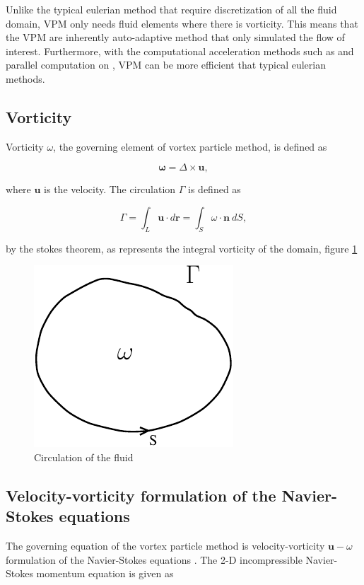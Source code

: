 
Unlike the typical eulerian method that require discretization of all the fluid domain, VPM only needs fluid elements where there is vorticity. This means that the VPM are inherently auto-adaptive method that only simulated the flow of interest. Furthermore, with the computational acceleration methods such as  and parallel computation on , VPM can be more efficient that typical eulerian methods.

\subsection{Vorticity}
Vorticity $\omega$, the governing element of vortex particle method, is defined as

	\begin{equation}
	\mathbf{\omega} = \Delta \times \mathbf{u},
	\end{equation}

where $\mathbf{u}$ is the velocity. The circulation $\Gamma$ is defined as

	\begin{equation}
	\Gamma = \int_L\mathbf{u}\cdot d \mathbf{r}=\int_S\omega\cdot\mathbf{n}\ dS,
	\label{eq:definitionOfCirculation}
	\end{equation}

by the stokes theorem, as represents the integral vorticity of the domain, figure \ref{fig:vorticityCirculation}

	\begin{figure}[t]
	\centering
	\includegraphics[width=0.3\linewidth]{./figures/lagrangian/vorticityCirculation.pdf}
	\caption{Circulation of the fluid}
	\label{fig:vorticityCirculation}
	\end{figure}

 
\subsection{Velocity-vorticity formulation of the Navier-Stokes equations}
The governing equation of the vortex particle method is velocity-vorticity $\mathbf{u}-\omega$ formulation of the Navier-Stokes equations \cite{Cottet2000a}. The 2-D incompressible Navier-Stokes momentum equation is given as

